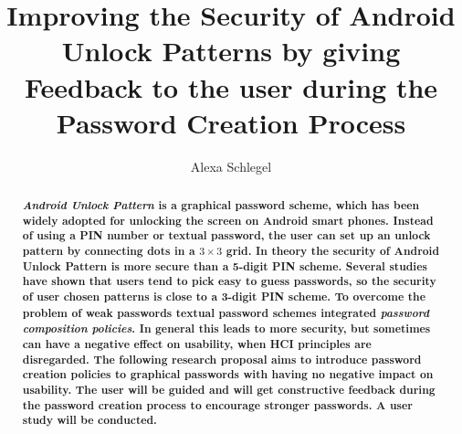 \documentclass[twocolumn, a4paper, 10pt]{article}
\begin{document}
\title{
	Improving the Security of Android Unlock Patterns by giving Feedback to the user during the Password Creation Process}

\author{
	Alexa Schlegel
}

\maketitle


\def\abstractname{{\textbf Abstract}}
\begin{abstract}
{
\bfseries
\textit{Android Unlock Pattern} is a graphical password scheme, which has been widely adopted for unlocking the screen on Android smart phones. Instead of using a PIN number or textual password, the user can set up an unlock pattern by connecting dots in a $3\times3$ grid.
In theory the security of Android Unlock Pattern is more secure than a 5-digit PIN scheme. Several studies have shown that users tend to pick easy to guess passwords, so the security of user chosen patterns is close to a 3-digit PIN scheme. To overcome the problem of weak passwords textual password schemes integrated \textit{password composition policies}. In general this leads to more security, but sometimes can have a negative effect on usability, when HCI principles are disregarded.
The following research proposal aims to introduce password creation policies to graphical passwords with having no negative impact on usability. The user will be guided and will get constructive feedback during the password creation process to encourage stronger passwords.  A user study will be conducted.
}
\end{abstract}
\end{document}
